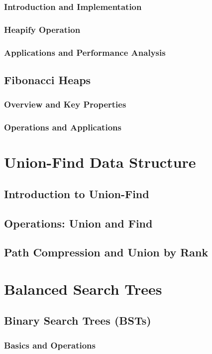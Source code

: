 \documentclass[12pt]{book} %
\begin{document}
\subsubsection{Introduction and Implementation}
\subsubsection{Heapify Operation}
\subsubsection{Applications and Performance Analysis}
\subsection{Fibonacci Heaps}
\subsubsection{Overview and Key Properties}
\subsubsection{Operations and Applications}

\section{Union-Find Data Structure}
\subsection{Introduction to Union-Find}
\subsection{Operations: Union and Find}
\subsection{Path Compression and Union by Rank}

\section{Balanced Search Trees}
\subsection{Binary Search Trees (BSTs)}
\subsubsection{Basics and Operations}
\end{document}
